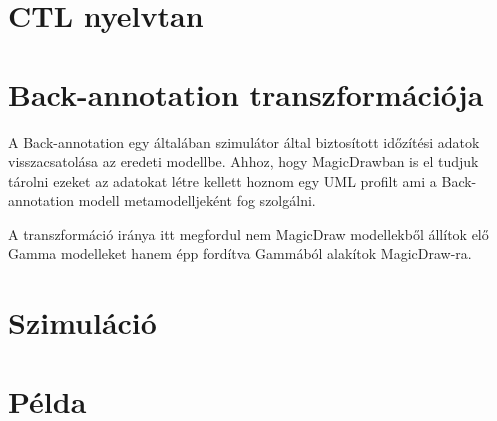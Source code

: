\section{CTL nyelvtan}

\section{Back-annotation transzformációja}

A Back-annotation egy általában szimulátor által biztosított időzítési adatok visszacsatolása az eredeti modellbe. Ahhoz, hogy MagicDrawban is el tudjuk tárolni ezeket az adatokat létre kellett hoznom egy UML profilt ami a Back-annotation modell metamodelljeként fog szolgálni.

A transzformáció iránya itt megfordul nem MagicDraw modellekből állítok elő Gamma modelleket hanem épp fordítva Gammából alakítok MagicDraw-ra.



\section{Szimuláció}

\section{Példa} %